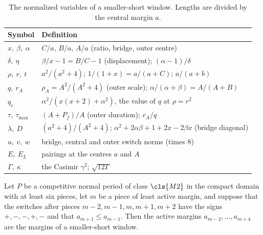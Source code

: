 \begin{table}[htbp]
\centering\small
\caption{The normalized variables of a smaller-short window. Lengths are divided by the central
margin $a$.}\label{tab:ss-variables}
\begin{tabular}{@{}ll@{}}
\toprule
Symbol & Definition \\
\midrule
$x,\ \beta,\ \alpha$ & $C/a$, $B/a$, $A/a$ (ratio, bridge, outer centre) \\
$\delta,\ \eta$ & $\beta/x-1=B/C-1$ (displacement); $(\alpha-1)/\delta$ \\
$\rho,\ r,\ t$ & $a^2/(a^2+4)$; $1/(1+x)=a/(a+C)$; $a/(a+b)$ \\
$q,\ r_A$ & $\rho_A=A^2/(A^2+4)$ (outer scale); $\alpha/(\alpha+\beta)=A/(A+B)$ \\
$q_c$ & $\alpha^2/(x(x+2)+\alpha^2)$, the value of $q$ at $\rho=r^2$ \\
$\tau,\ \tau_{\max}$ & $(A+P_f)/A$ (outer duration); $r_A/q$ \\
$\lambda,\ D$ & $(a^2+4)/(A^2+4)$; $\alpha^2+2\alpha\beta+1+2x-2\beta x$ (bridge diagonal) \\
$u,\ v,\ w$ & bridge, central and outer switch norms (times $8$) \\
$E,\ E_L$ & pairings at the centres $a$ and $A$ \\
$\Gamma,\ \kappa$ & the Casimir $\gamma^2$; $\sqrt{12\Gamma}$ \\
\bottomrule
\end{tabular}
\end{table}

\begin{proposition}\label{prop:ss-extraction}
Let $P$ be a competitive normal period of class $\cls{M2}$ in the compact domain with at least six
pieces, let $m$ be a piece of least active margin, and suppose that the switches after pieces
$m-2,m-1,m,m+1,m+2$ have the signs $+,-,-,+,-$ and that $a_{m+1}\le a_{m-1}$. Then the active
margins $a_{m-2},\dots,a_{m+4}$ are the margins of a smaller-short window.
\end{proposition}

